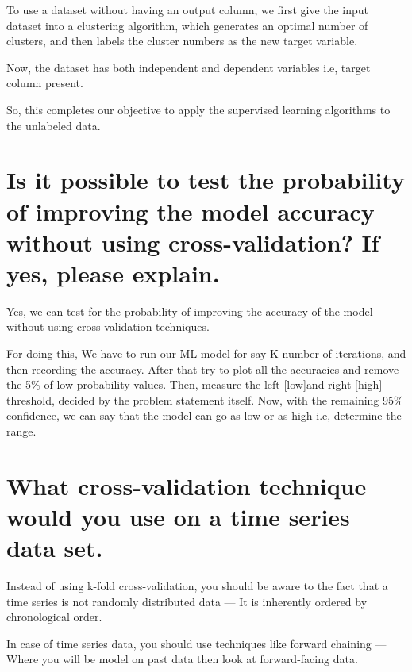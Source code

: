 \documentclass[
]{book}
\begin{document}
To use a dataset without having an output column, we first give the input dataset into a clustering algorithm, which generates an optimal number of clusters, and then labels the cluster numbers as the new target variable.

Now, the dataset has both independent and dependent variables i.e, target column present.

So, this completes our objective to apply the supervised learning algorithms to the unlabeled data.

\hypertarget{is-it-possible-to-test-the-probability-of-improving-the-model-accuracy-without-using-cross-validation-if-yes-please-explain.}{%
\section{Is it possible to test the probability of improving the model accuracy without using cross-validation? If yes, please explain.}\label{is-it-possible-to-test-the-probability-of-improving-the-model-accuracy-without-using-cross-validation-if-yes-please-explain.}}

Yes, we can test for the probability of improving the accuracy of the model without using cross-validation techniques.

For doing this, We have to run our ML model for say K number of iterations, and then recording the accuracy. After that try to plot all the accuracies and remove the 5\% of low probability values. Then, measure the left {[}low{]}and right {[}high{]} threshold, decided by the problem statement itself.
Now, with the remaining 95\% confidence, we can say that the model can go as low or as high i.e, determine the range.

\hypertarget{what-cross-validation-technique-would-you-use-on-a-time-series-data-set.}{%
\section{What cross-validation technique would you use on a time series data set.}\label{what-cross-validation-technique-would-you-use-on-a-time-series-data-set.}}

Instead of using k-fold cross-validation, you should be aware to the fact that a time series is not randomly distributed data --- It is inherently ordered by chronological order.

In case of time series data, you should use techniques like forward chaining --- Where you will be model on past data then look at forward-facing data.
\end{document}
